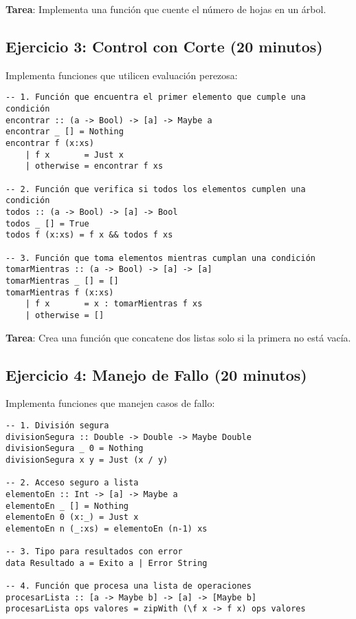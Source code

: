 \documentclass[12pt]{article}
\begin{document}
\textbf{Tarea}: Implementa una función que cuente el número de hojas en un árbol.

\subsection{Ejercicio 3: Control con Corte (20 minutos)}

Implementa funciones que utilicen evaluación perezosa:

\begin{lstlisting}
-- 1. Función que encuentra el primer elemento que cumple una condición
encontrar :: (a -> Bool) -> [a] -> Maybe a
encontrar _ [] = Nothing
encontrar f (x:xs)
    | f x       = Just x
    | otherwise = encontrar f xs

-- 2. Función que verifica si todos los elementos cumplen una condición
todos :: (a -> Bool) -> [a] -> Bool
todos _ [] = True
todos f (x:xs) = f x && todos f xs

-- 3. Función que toma elementos mientras cumplan una condición
tomarMientras :: (a -> Bool) -> [a] -> [a]
tomarMientras _ [] = []
tomarMientras f (x:xs)
    | f x       = x : tomarMientras f xs
    | otherwise = []
\end{lstlisting}

\textbf{Tarea}: Crea una función que concatene dos listas solo si la primera no está vacía.

\subsection{Ejercicio 4: Manejo de Fallo (20 minutos)}

Implementa funciones que manejen casos de fallo:

\begin{lstlisting}
-- 1. División segura
divisionSegura :: Double -> Double -> Maybe Double
divisionSegura _ 0 = Nothing
divisionSegura x y = Just (x / y)

-- 2. Acceso seguro a lista
elementoEn :: Int -> [a] -> Maybe a
elementoEn _ [] = Nothing
elementoEn 0 (x:_) = Just x
elementoEn n (_:xs) = elementoEn (n-1) xs

-- 3. Tipo para resultados con error
data Resultado a = Exito a | Error String

-- 4. Función que procesa una lista de operaciones
procesarLista :: [a -> Maybe b] -> [a] -> [Maybe b]
procesarLista ops valores = zipWith (\f x -> f x) ops valores
\end{lstlisting}
\end{document}
